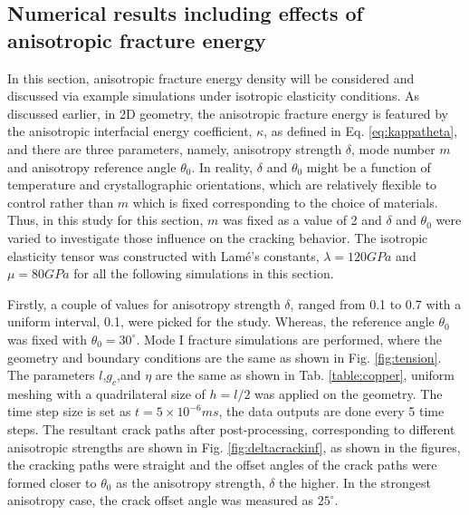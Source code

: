 \documentclass[3p,10pt,sort&compress]{elsarticle}
\newcommand{\dkimadd}[1]{{\color{red}#1}}
\newcommand{\dkimdel}[1]{{\color{yellow}#1}}
\begin{document}
\subsection{Numerical results including effects of anisotropic fracture energy}
In this section, anisotropic fracture energy density will be considered and discussed via example simulations under isotropic elasticity conditions. As discussed earlier, in 2D geometry, the anisotropic fracture energy is featured by the anisotropic interfacial energy coefficient, $\kappa$, as defined in Eq. \ref{eq:kappatheta}, and there are three parameters, namely, anisotropy strength $\delta$, mode number $m$ and anisotropy reference angle $\theta_0$. In reality, $\delta$ and $\theta_0$ might be a function of temperature and crystallographic orientations, which are relatively flexible to control rather than $m$ which is fixed corresponding to the choice of materials. Thus, in this study for this section, $m$ was fixed as a value of 2 and $\delta$ and $\theta_0$ were varied to investigate those influence on the cracking behavior. The isotropic elasticity tensor was constructed with Lam\'{e}'s constants, $\lambda = 120 GPa$ and $\mu = 80 GPa$ for all the following simulations in this section.

Firstly, a couple of values for anisotropy strength $\delta$, ranged from 0.1 to 0.7 with a uniform interval, 0.1, were picked for the study. Whereas, the reference angle $\theta_0$ was fixed with $\theta_0 = 30^\circ$. Mode I fracture simulations are performed, where the geometry and boundary conditions are the same as shown in Fig. \ref{fig:tension}. The parameters $l$,$g_c$,and $\eta$ are the same as shown in Tab. \ref{table:copper}, uniform meshing with a quadrilateral size of $h=l/2$ was applied on the geometry. The time step size is set as $t=5\times10^{-6}ms$, the data outputs are done every 5 time steps. The resultant crack paths after post-processing, corresponding to different anisotropic strengths are shown in Fig. \ref{fig:deltacrackinf}, as shown in the figures, the cracking paths were straight and the offset angles of the crack paths were formed closer to $\theta_0$ as the anisotropy strength, $\delta$ the higher. In the strongest anisotropy case, the crack offset angle was measured as $25^\circ$.
\end{document}
